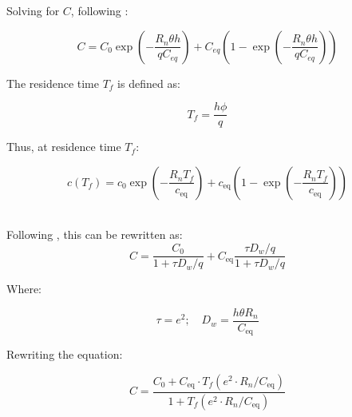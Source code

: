 \begin{tcolorbox}
{Solving for \( C \), following \textcite{maherHydrologicRegulationChemical2014}:

\begin{equation}
    C = C_0 \exp \left( -\frac{R_n \theta h}{q C_{eq}} \right) + C_{eq} \left( 1 - \exp \left( -\frac{R_n \theta h}{q C_{eq}} \right) \right)
\end{equation}

The residence time \( T_f \) is defined as:

\begin{equation}
    T_f = \frac{h \phi}{q}
\end{equation}

Thus, at residence time \( T_f \):

\begin{equation}
c(T_f) = c_0 \exp\left(-\frac{R_n T_f}{c_{\text{eq}}} \right) + c_{\text{eq}} \left( 1 - \exp\left(-\frac{R_n T_f}{c_{\text{eq}}} \right) \right)
\end{equation}\\


\begin{multicols}{2}

Following \textcite{maherHydrologicRegulationChemical2014}, this can be rewritten as:
\columnbreak
\begin{equation}
    C =  \frac{C_{\text{0}}}{1 + \tau D_w / q} + C_{\text{eq}} \frac{\tau D_w / q}{1 + \tau D_w / q}
\end{equation}
    
\end{multicols}

\begin{multicols}{2}

Where:

\columnbreak
\begin{equation}
\tau = e^2; \quad D_w = \frac{h\theta R_n}{C_{\text{eq}}}
\end{equation}

\end{multicols}

\begin{multicols}{2}

Rewriting the equation:

\columnbreak

\begin{equation}
    C = \frac{C_{\text{0}} + C_{\text{eq}} \cdot T_f\left(e^2 \cdot R_n / C_{\text{eq}}\right)}{1 + T_f\left(e^2 \cdot R_n / C_{\text{eq}}\right)}
\end{equation}


\end{multicols}}
\end{tcolorbox}
